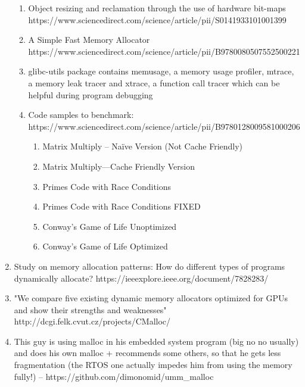 \documentclass{article}
\begin{document}
\begin{enumerate}
\begin{enumerate}
        \item Object resizing and reclamation through the use of hardware bit-maps \\
        https://www.sciencedirect.com/science/article/pii/S0141933101001399
        \item A Simple Fast Memory Allocator \\
        https://www.sciencedirect.com/science/article/pii/B9780080507552500221
        \item glibc-utils package contains memusage, a memory usage profiler, mtrace, a memory leak tracer and xtrace, a function call tracer which can be helpful during program debugging
        \item Code samples to benchmark: https://www.sciencedirect.com/science/article/pii/B9780128009581000206
        \begin{enumerate}
            \item Matrix Multiply – Naïve Version (Not Cache Friendly)
            \item Matrix Multiply—Cache Friendly Version
            \item Primes Code with Race Conditions
            \item Primes Code with Race Conditions FIXED
            \item Conway’s Game of Life Unoptimized
            \item Conway’s Game of Life Optimized
        \end{enumerate}
    \end{enumerate}
        
    \item{Study on memory allocation patterns: How do different types of programs dynamically allocate? https://ieeexplore.ieee.org/document/7828283/}
    \item "We compare five existing dynamic memory allocators optimized for GPUs and show their strengths and weaknesses" \\
    http://dcgi.felk.cvut.cz/projects/CMalloc/
    \item This guy is using malloc in his embedded system program (big no no usually) and does his own malloc + recommends some others, so that he gets less fragmentation (the RTOS one actually impedes him from using the memory fully!) -- https://github.com/dimonomid/umm\_malloc

\end{enumerate}
\end{document}
